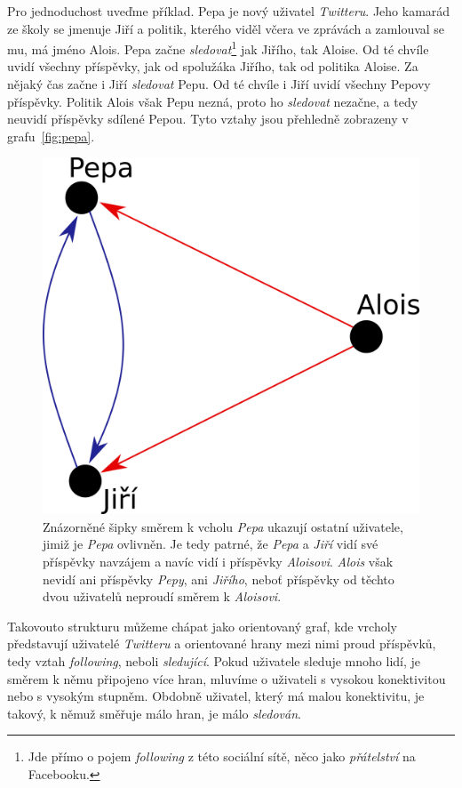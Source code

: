 \documentclass[12pt, a4paper]{article}
\numberwithin{equation}{section} 	%
\begin{document}
Pro jednoduchost uveďme příklad. Pepa je nový uživatel \textit{Twitteru}. Jeho kamarád ze školy se jmenuje Jiří a politik, kterého viděl včera ve zprávách a zamlouval se mu, má jméno Alois. Pepa začne \textit{sledovat}\footnote{Jde přímo o pojem \textit{following} z této sociální sítě, něco jako \textit{přátelství} na Facebooku.} jak Jiřího, tak Aloise. Od té chvíle uvidí všechny příspěvky, jak od spolužáka Jiřího, tak od politika Aloise. Za nějaký čas začne i Jiří \textit{sledovat} Pepu. Od té chvíle i Jiří uvidí všechny Pepovy příspěvky. Politik Alois však Pepu nezná, proto ho \textit{sledovat} nezačne, a tedy neuvidí příspěvky sdílené Pepou. Tyto vztahy jsou přehledně zobrazeny v grafu~\autoref{fig:pepa}.
\begin{figure}[h]
\centering
\includegraphics[scale=0.35]{./Pics/pepa.png}
    \caption{Znázorněné šipky směrem k vcholu \textit{Pepa} ukazují ostatní uživatele, jimiž je \textit{Pepa} ovlivněn. Je tedy patrné, že \textit{Pepa} a       \textit{Jiří} vidí své příspěvky navzájem a navíc vidí i příspěvky \textit{Aloisovi}. \textit{Alois} však nevidí ani příspěvky \textit{Pepy}, ani \textit{Jiřího}, neboť příspěvky od těchto dvou uživatelů neproudí směrem k \textit{Aloisovi}.}
\label{fig:pepa}
\end{figure}

Takovouto strukturu můžeme chápat jako orientovaný graf, kde vrcholy před\-sta\-vu\-jí uživatelé \textit{Twitteru} a orientované hrany mezi nimi proud příspěvků, tedy vztah \textit{following}, neboli \textit{sledující}. Pokud uživatele sleduje mnoho lidí, je směrem k němu připojeno více hran, mluvíme o uživateli s vysokou konektivitou nebo s vysokým stupněm. Obdobně uživatel, který má malou konektivitu, je takový, k němuž směřuje málo hran, je málo \textit{sledován}.
\end{document}
